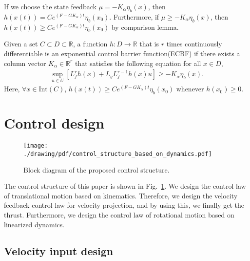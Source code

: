 If we choose the state feedback $ \mu = - K_{\alpha} \eta_b (x) $, then $ h(x(t)) = C e^{(F - GK_{\alpha})t} \eta_b (x_0) $.
Furthermore, if $ \mu \geq -K_{\alpha} \eta_b (x) $, then $ h(x(t)) \geq C e^{(F - GK_{\alpha})t} \eta_b (x_0) $ by comparison lemma.

\begin{definition}
    Given a set $ C \subset D \subset \mathbb{R} $, a function $ h : D \rightarrow \mathbb{R} $ that is $ r $ times continuously differentiable is an exponential control barrier function(ECBF) if there exists a column vector $ K_{\alpha} \in \mathbb{R}^r $ that satisfies the following equation for all $ x \in D $,
    \begin{align}
        \label{eq:definition_of_ECBF}
        \sup_{u \in U} [ L_f^r h(x) + L_g L_f^{r-1} h(x) u] \geq - K_{\alpha} \eta_b (x).
    \end{align}
    Here, $ \forall x \in \mathrm{Int} (C) $, $ h(x(t)) \geq C e^{(F - GK_{\alpha})t} \eta_b (x_0) $ whenever $ h(x_0) \geq 0 $.
\end{definition}

\section{Control design}
\label{sec:control_design}

\begin{figure}[t]
\centering
\texttt{[image: ./drawing/pdf/control\_structure\_based\_on\_dynamics.pdf]}
\caption{Block diagram of the proposed control structure.}
\label{fig:block_diagram_of_the_proposed_control_structure}
\end{figure}
The control structure of this paper is shown in Fig.~\ref{fig:block_diagram_of_the_proposed_control_structure}.
We design the control law of translational motion based on kinematics. 
Therefore, we design the velocity feedback control law for velocity projection, and by using this, we finally get the thrust.
Furthermore, we design the control law of rotational motion based on linearized dynamics.
\subsection{Velocity input design}
\label{subsec:velocity_input_design}

